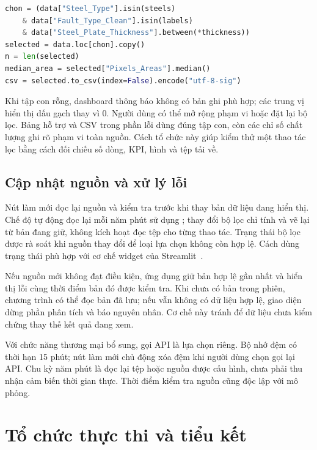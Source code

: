 \noindent\begin{minipage}{\linewidth}
\begin{lstlisting}[language=Python]
chon = (data["Steel_Type"].isin(steels)
    & data["Fault_Type_Clean"].isin(labels)
    & data["Steel_Plate_Thickness"].between(*thickness))
selected = data.loc[chon].copy()
n = len(selected)
median_area = selected["Pixels_Areas"].median()
csv = selected.to_csv(index=False).encode("utf-8-sig")
\end{lstlisting}
\end{minipage}\par

Khi tập con rỗng, dashboard thông báo không có bản ghi phù hợp; các trung vị hiển thị dấu gạch thay vì 0. Người dùng có thể mở rộng phạm vi hoặc đặt lại bộ lọc. Bảng hỗ trợ và CSV trong phần lỗi dùng đúng tập con, còn các chỉ số chất lượng ghi rõ phạm vi toàn nguồn. Cách tổ chức này giúp kiểm thử một thao tác lọc bằng cách đối chiếu số dòng, KPI, hình và tệp tải về.

\subsection{Cập nhật nguồn và xử lý lỗi}

Nút làm mới đọc lại nguồn và kiểm tra trước khi thay bản dữ liệu đang hiển thị. Chế độ tự động đọc lại mỗi năm phút sử dụng ; thay đổi bộ lọc chỉ tính và vẽ lại từ bản đang giữ, không kích hoạt đọc tệp cho từng thao tác. Trạng thái bộ lọc được rà soát khi nguồn thay đổi để loại lựa chọn không còn hợp lệ. Cách dùng trạng thái phù hợp với cơ chế widget của Streamlit~\cite{streamlit}.

Nếu nguồn mới không đạt điều kiện, ứng dụng giữ bản hợp lệ gần nhất và hiển thị lỗi cùng thời điểm bản đó được kiểm tra. Khi chưa có bản trong phiên, chương trình có thể đọc bản đã lưu; nếu vẫn không có dữ liệu hợp lệ, giao diện dừng phần phân tích và báo nguyên nhân. Cơ chế này tránh để dữ liệu chưa kiểm chứng thay thế kết quả đang xem.

Với chức năng thương mại bổ sung, gọi API là lựa chọn riêng. Bộ nhớ đệm có thời hạn 15 phút; nút làm mới chủ động xóa đệm khi người dùng chọn gọi lại API. Chu kỳ năm phút là đọc lại tệp hoặc nguồn được cấu hình, chưa phải thu nhận cảm biến thời gian thực. Thời điểm kiểm tra nguồn cũng độc lập với  mô phỏng.

\section{Tổ chức thực thi và tiểu kết}

